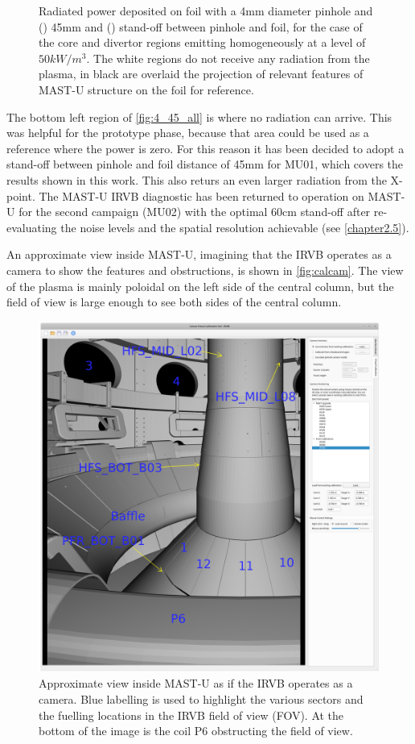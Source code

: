 \begin{figure}[!ht]
     \caption{Radiated power deposited on foil with a 4mm diameter pinhole and () 45mm and () stand-off between pinhole and foil, for the case of the core and divertor regions emitting homogeneously at a level of $50kW/m^3$. The white regions do not receive any radiation from the plasma, in black are overlaid the projection of relevant features of MAST-U structure on the foil for reference.}
    \label{fig:cherab2}
\end{figure}
The bottom left region of \autoref{fig:4_45_all} is where no radiation can arrive. This was helpful for the prototype phase, because that area could be used as a reference where the power is zero.
For this reason it has been decided to adopt a stand-off between pinhole and foil distance of 45mm for MU01, which covers the results shown in this work. This also returs an even larger radiation from the X-point. The MAST-U IRVB diagnostic has been returned to operation on MAST-U for the second campaign (MU02) with the optimal 60cm stand-off after re-evaluating the noise levels %
and the spatial resolution achievable (see \autoref{chapter2.5}).

An approximate view inside MAST-U, imagining that the IRVB operates as a camera to show the features and obstructions, is shown in \autoref{fig:calcam}. The view of the plasma is mainly poloidal on the left side of the central column, but the field of view is large enough to see both sides of the central column.

\begin{figure}[!ht]
	\centering
	\includegraphics[trim={30 30 450 90},clip,width=0.5\linewidth]{Chapters/chapter2/figs/calcam4.png}
	\caption{Approximate view inside MAST-U as if the IRVB operates as a camera. Blue labelling is used to highlight the various sectors and the fuelling locations in the IRVB field of view (FOV). At the bottom of the image is the coil P6 obstructing the field of view.}
	\label{fig:calcam}
\end{figure}

